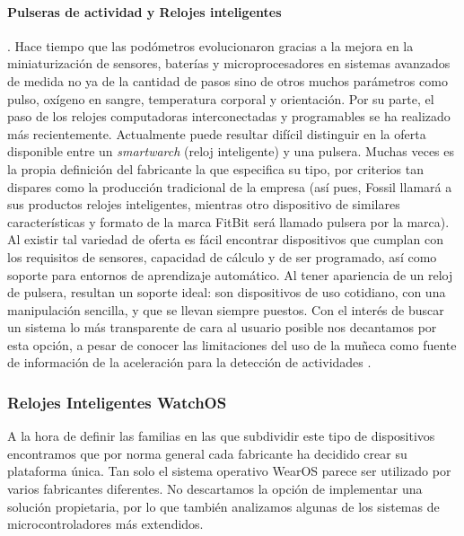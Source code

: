 \paragraph{Pulseras de actividad y Relojes inteligentes}. Hace tiempo que las podómetros evolucionaron gracias a la mejora en la miniaturización de sensores, baterías y microprocesadores en sistemas avanzados de medida no ya de la cantidad de pasos sino de otros muchos parámetros como pulso, oxígeno en sangre, temperatura corporal y orientación. Por su parte, el paso de los relojes computadoras interconectadas y programables se ha realizado más recientemente. Actualmente puede resultar difícil distinguir en la oferta disponible entre un \textit{smartwarch} (reloj inteligente) y una pulsera. Muchas veces es la propia definición del fabricante la que especifica su tipo, por criterios tan dispares como la producción tradicional de la empresa (así pues, Fossil llamará a sus productos relojes inteligentes, mientras otro dispositivo de similares características y formato de la marca FitBit será llamado pulsera por la marca). Al existir tal variedad de oferta es fácil encontrar dispositivos que cumplan con los requisitos de sensores, capacidad de cálculo y de ser programado, así como soporte para entornos de aprendizaje automático. Al tener apariencia de un reloj de pulsera, resultan un soporte ideal: son dispositivos de uso cotidiano, con una manipulación sencilla, y que se llevan siempre puestos. Con el interés de buscar un sistema lo más transparente de cara al usuario posible nos decantamos por esta opción, a pesar de conocer las limitaciones del uso de la muñeca como fuente de información de la aceleración para la detección de actividades \cite{Chen2005} .

\subsubsection{Relojes Inteligentes WatchOS}

A la hora de definir las familias en las que subdividir este tipo de dispositivos encontramos que por norma general cada fabricante ha decidido crear su plataforma única. Tan solo el sistema operativo WearOS parece ser utilizado por varios fabricantes diferentes. No descartamos la opción de implementar una solución propietaria, por lo que también analizamos algunas de los sistemas de microcontroladores más extendidos.

